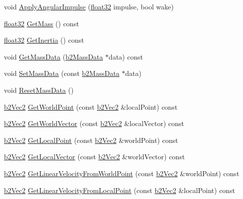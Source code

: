 \begin{DoxyCompactItemize}
\item 
void \mbox{\hyperlink{classb2_body_a65384cfad8db2376cdf3fab38cac06e5}{Apply\+Angular\+Impulse}} (\mbox{\hyperlink{b2_settings_8h_aacdc525d6f7bddb3ae95d5c311bd06a1}{float32}} impulse, bool wake)
\item 
\mbox{\hyperlink{b2_settings_8h_aacdc525d6f7bddb3ae95d5c311bd06a1}{float32}} \mbox{\hyperlink{classb2_body_adfeebf45965d131894f728a2f264311d}{Get\+Mass}} () const
\item 
\mbox{\hyperlink{b2_settings_8h_aacdc525d6f7bddb3ae95d5c311bd06a1}{float32}} \mbox{\hyperlink{classb2_body_a60929c13e4b6548492dca5ec79f159db}{Get\+Inertia}} () const
\item 
void \mbox{\hyperlink{classb2_body_a5100927dbd39dd0addea79d5f323f3f1}{Get\+Mass\+Data}} (\mbox{\hyperlink{structb2_mass_data}{b2\+Mass\+Data}} $\ast$data) const
\item 
void \mbox{\hyperlink{classb2_body_a58a641fedf8a81e1e26d09ec00a22fe2}{Set\+Mass\+Data}} (const \mbox{\hyperlink{structb2_mass_data}{b2\+Mass\+Data}} $\ast$data)
\item 
void \mbox{\hyperlink{classb2_body_a109d8567c6ae84c61fce2919fb209c63}{Reset\+Mass\+Data}} ()
\item 
\mbox{\hyperlink{structb2_vec2}{b2\+Vec2}} \mbox{\hyperlink{classb2_body_a712b782c61963c6f07beca86acc631ae}{Get\+World\+Point}} (const \mbox{\hyperlink{structb2_vec2}{b2\+Vec2}} \&local\+Point) const
\item 
\mbox{\hyperlink{structb2_vec2}{b2\+Vec2}} \mbox{\hyperlink{classb2_body_ae8c434785b2a730f7c385e708b345bb6}{Get\+World\+Vector}} (const \mbox{\hyperlink{structb2_vec2}{b2\+Vec2}} \&local\+Vector) const
\item 
\mbox{\hyperlink{structb2_vec2}{b2\+Vec2}} \mbox{\hyperlink{classb2_body_a0df8f4312ab23223489323326b2d763d}{Get\+Local\+Point}} (const \mbox{\hyperlink{structb2_vec2}{b2\+Vec2}} \&world\+Point) const
\item 
\mbox{\hyperlink{structb2_vec2}{b2\+Vec2}} \mbox{\hyperlink{classb2_body_aed2f88179cedf4cdbdc47429ebe41288}{Get\+Local\+Vector}} (const \mbox{\hyperlink{structb2_vec2}{b2\+Vec2}} \&world\+Vector) const
\item 
\mbox{\hyperlink{structb2_vec2}{b2\+Vec2}} \mbox{\hyperlink{classb2_body_a5bc9a483e5f59199daa1751786034c1d}{Get\+Linear\+Velocity\+From\+World\+Point}} (const \mbox{\hyperlink{structb2_vec2}{b2\+Vec2}} \&world\+Point) const
\item 
\mbox{\hyperlink{structb2_vec2}{b2\+Vec2}} \mbox{\hyperlink{classb2_body_a0ac0a4ad6ac3c7804652d9994239dcbd}{Get\+Linear\+Velocity\+From\+Local\+Point}} (const \mbox{\hyperlink{structb2_vec2}{b2\+Vec2}} \&local\+Point) const

\end{DoxyCompactItemize}
